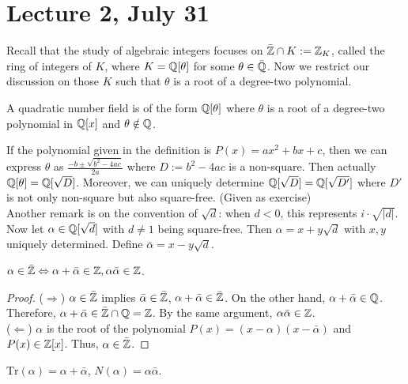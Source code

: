 \documentclass[12pt,twoside=semi,openright,numbers=noenddot]{scrbook}
\begin{document}
\section{Lecture 2, July 31}
Recall that the study of algebraic integers focuses on $\bar{\mathbb Z} \cap K := \mathbb Z_K$, called the ring of integers of $K$, where $K = \mathbb Q[\theta]$ for some $\theta \in \bar{\mathbb Q}$.
Now we restrict our discussion on those $K$ such that $\theta$ is a root of a degree-two polynomial. 
\begin{definition}
    A  quadratic number field is of the form $\mathbb Q[\theta]$ where $\theta$ is a root of a degree-two polynomial in $\mathbb Q[x]$ and $\theta \notin \mathbb Q$.
\end{definition}
If the polynomial given in the definition is $P(x) = ax^2+bx+c$, then we can express $\theta$ as $\frac{-b\pm \sqrt{b^2-4ac}}{2a}$ where $D:= b^2-4ac$ is a non-square.
Then actually $\mathbb Q[\theta] = \mathbb Q[\sqrt{D}]$. Moreover, we can uniquely determine $\mathbb Q[\sqrt{D}] = \mathbb Q[\sqrt{D'}]$ where $D'$ is not only non-square but also 
square-free. (Given as exercise)  \\
Another remark is on the convention of $\sqrt{d}$: when $d<0$, this represents $i \cdot \sqrt{|d|}$. \\
Now let $\alpha \in \mathbb Q[\sqrt{d}]$ with $d \neq 1$ being square-free. Then $\alpha = x+y\sqrt{d}$ with $x, y$ uniquely determined.
Define $\bar{\alpha} = x-y\sqrt{d}$.
\begin{remark}
    $\alpha \in \bar{\mathbb Z} \Leftrightarrow \alpha + \bar{\alpha} \in \mathbb Z, \alpha\bar{\alpha}\in \mathbb Z$.
\end{remark}
    \begin{proof}
        ($\Rightarrow$) $\alpha \in \bar{\mathbb Z}$ implies $\bar{\alpha} \in \bar{\mathbb Z}$, $\alpha + \bar{\alpha} \in \bar{\mathbb Z}$. On the other hand,
        $\alpha + \bar{\alpha} \in \mathbb Q$. Therefore, 
        $\alpha + \bar{\alpha} \in \bar{\mathbb Z}\cap \mathbb Q = \mathbb Z$. By the same argument, $\alpha\bar{\alpha} \in \mathbb Z$. \\
        ($\Leftarrow$) $\alpha$ is the root of the polynomial $P(x) = (x-\alpha)(x-\bar{\alpha})$ and $P(x) \in \mathbb Z[x]$. 
        Thus, $\alpha \in \bar{\mathbb Z}$.
    \end{proof}

\begin{remark}
    $\mathrm{Tr}(\alpha) = \alpha + \bar{\alpha}$, $N(\alpha) = \alpha\bar{\alpha}$.
\end{remark}
\end{document}
